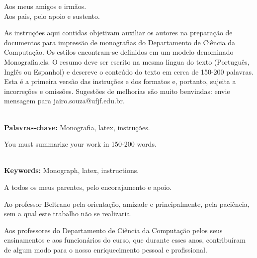\documentclass[a4paper,12pt]{monografia}
\theoremstyle{plain}
\theoremstyle{definition}
\theoremstyle{remark}
\begin{document}




\begin{dedicatoria}
Aos meus amigos e irm\~aos.\\
Aos pais, pelo apoio e sustento.\\
\end{dedicatoria}


 As instru\c{c}\~oes aqui contidas objetivam auxiliar os autores na prepara\c{c}\~ao de documentos para impress\~ao de monografias do Departamento de Ci\^encia da Computa\c{c}\~ao. Os estilos encontram-se definidos em um modelo denominado Monografia.cls. O resumo deve ser escrito na mesma l\'ingua do texto (Portugu\^es, Ingl\^es ou Espanhol) e descreve o conte\'udo do texto em cerca de 150-200 palavras. Esta \'e a primeira vers\~ao das instru\c{c}\~oes e dos formatos e, portanto, sujeita a incorre\c{c}\~oes e omiss\~oes. Sugest\~oes de melhorias s\~ao muito benvindas: envie mensagem para jairo.souza@ufjf.edu.br.

\noindent \\ \textbf{Palavras-chave:} Monografia, latex, instru\c{c}\~oes.



 You must summarize your work in 150-200 words.

\noindent \\ \textbf{Keywords:} Monograph, latex, instructions.





 \indent\indent 
A todos os meus parentes, pelo encorajamento e
apoio.

Ao professor Beltrano pela orienta\c{c}\~ao, amizade e
principalmente, pela paci\^encia, sem a qual este trabalho n\~ao se
realizaria.


Aos professores do Departamento de Ci\^encia da Computa\c{c}\~ao pelos seus
ensinamentos e aos funcion\'arios do curso, que durante esses anos,
contribu\'iram de algum modo para o nosso enriquecimento pessoal e
profissional.
\newpage
\end{document}
